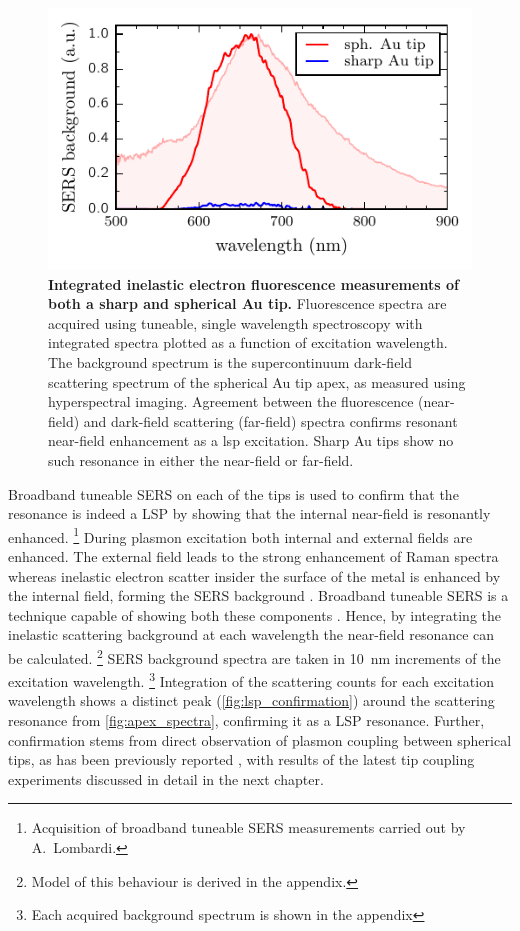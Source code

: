 \documentclass{article}
\begin{document}
\begin{figure}[bt]
\centering
\includegraphics{figures/lsp_confirmation}
\caption[Integrated inelastic electron fluorescence measurements of both a sharp and spherical Au tip]{\textbf{Integrated inelastic electron fluorescence measurements of both a sharp and spherical Au tip.} Fluorescence spectra are acquired using tuneable, single wavelength spectroscopy with integrated spectra plotted as a function of excitation wavelength. The background spectrum is the supercontinuum dark-field scattering spectrum of the spherical Au tip apex, as measured using hyperspectral imaging. Agreement between the fluorescence (near-field) and dark-field scattering (far-field) spectra confirms resonant near-field enhancement as a \gls{lsp} excitation. Sharp Au tips show no such resonance in either the near-field or far-field.}
\label{fig:lsp_confirmation}
\vspace{-5pt}
\end{figure}

Broadband tuneable SERS \cite{lombardi2015} on each of the tips is used to confirm that the resonance is indeed a LSP by showing that the internal near-field is resonantly enhanced.%
\footnote{Acquisition of broadband tuneable SERS measurements carried out by A.\ Lombardi.}
During plasmon excitation both internal and external fields are enhanced. The external field leads to the strong enhancement of Raman spectra whereas inelastic electron scatter insider the surface of the metal is enhanced by the internal field, forming the SERS background \cite{hugall2015}. Broadband tuneable SERS is a technique capable of showing both these components \cite{lombardi2015}. Hence, by integrating the inelastic scattering background at each wavelength the near-field resonance can be calculated.%
\footnote{Model of this behaviour is derived in the appendix.}
SERS background spectra are taken in \SI{10}{nm} increments of the excitation wavelength.%
\footnote{Each acquired background spectrum is shown in the appendix}
Integration of the scattering counts for each excitation wavelength shows a distinct peak (\autoref{fig:lsp_confirmation}) around the scattering resonance from \autoref{fig:apex_spectra}, confirming it as a LSP resonance. Further, confirmation stems from direct observation of plasmon coupling between spherical tips, as has been previously reported \cite{savage2012}, with results of the latest tip coupling experiments discussed in detail in the next chapter.
\end{document}
